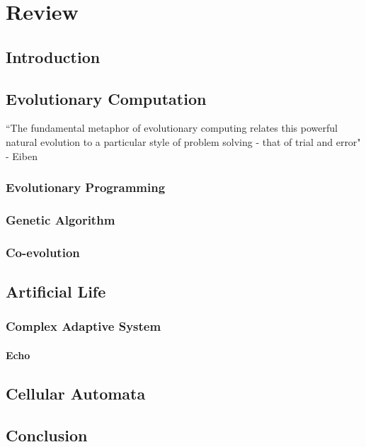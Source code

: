 \chapter{Review}

\section{Introduction}

\section{Evolutionary Computation}

``The fundamental metaphor of evolutionary computing relates this powerful natural evolution to a particular style of problem solving - that of trial and error" - Eiben \cite{eiben2003}

\subsection{Evolutionary Programming}

\subsection{Genetic Algorithm}

\subsection{Co-evolution}

\section{Artificial Life}

\subsection{Complex Adaptive System}

\subsubsection{Echo}

\section{Cellular Automata}

\section{Conclusion}